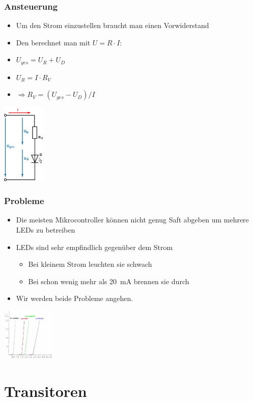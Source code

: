 \documentclass[ngerman,compress]{beamer}
\begin{document}
\begin{frame}
	\frametitle{Ansteuerung}
	\begin{itemize}
		\item Um den Strom einzustellen braucht man einen Vorwiderstand
		\item Den berechnet man mit $U = R \cdot I$:
		\item $U_{ges} = U_R + U_D$
		\item $U_R = I \cdot R_V$
		\item $\Rightarrow R_V = (U_{ges} - U_D) / I$
	\end{itemize}
	\includegraphics[width=0.8in]{vorwid.png}
\end{frame}

\begin{frame}
	\frametitle{Probleme}
	\begin{itemize}
		\item Die meisten Mikrocontroller können nicht genug Saft abgeben um
			mehrere LEDs zu betreiben
		\item LEDs sind sehr empfindlich gegenüber dem Strom
		\begin{itemize}
			\item Bei kleinem Strom leuchten sie schwach
			\item Bei schon wenig mehr als \SI{20}{\milli\ampere} brennen sie durch
		\end{itemize}
		\item Wir werden beide Probleme angehen.
	\end{itemize}
	\includegraphics[width=1in]{led.jpg}
\end{frame}


\section{Transitoren}
\end{document}
